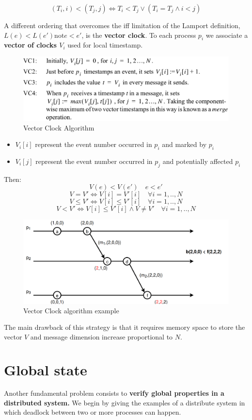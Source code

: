 \[(T_i, i) < (T_j, j) \iff T_i < T_j \vee (T_i = T_j \wedge i < j)\]

A different ordering that overcomes the iff limitation of the Lamport definition, \(L(e) < L(e') \textrm{not} e<e'\), is the \textbf{vector clock}. To each process \(p_i\) we associate a \textbf{vector of clocks \(V_i\)} used for local timestamp.

\begin{figure}[!h]
    \centering
    \includegraphics[width=.90\linewidth]{images/Clock/vectorClockAlg.png}
    \caption{Vector Clock Algorithm}
\end{figure}

\begin{itemize}
    \item \(V_i[i]\) represent the event number occurred in \(p_i\) and marked by \(p_i\)
    \item \(V_i[j]\) represent the event number occurred in \(p_j\) and potentially affected \(p_i\)
\end{itemize}
Then:
\[V(e) < V(e') \quad e < e'\]
\[V = V' \iff V[i] = V'[i] \quad \forall i = 1,..,N\]
\[V \leq V' \iff V[i] \leq V'[i] \quad \forall i = 1,..,N\]
\[V < V' \iff V[i] \leq V'[i] \wedge V \neq V' \quad \forall i = 1,..,N\]
 \newpage
\begin{figure}[!h]
    \centering
    \includegraphics[width=.60\linewidth]{images/Clock/vectorClock.png}
    \caption{Vector Clock algorithm example}
\end{figure}

The main drawback of this strategy is that it requires memory space to store the vector \(V\) and message dimension increase proportional to \(N\).

\section{Global state}
Another fundamental problem consists to \textbf{verify global properties in a distributed system.} We begin by giving the examples of a distribute system in which deadlock between two or more processes can happen.

